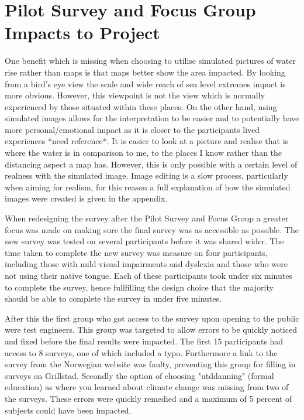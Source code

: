 \section{Pilot Survey and Focus Group Impacts to Project}
One benefit which is missing when choosing to utilise simulated pictures of water rise rather than maps is that maps better show the area impacted. By looking from a bird’s eye view the scale and wide reach of sea level extremes impact is more obvious. However, this viewpoint is not the view which is normally experienced by those situated within these places. On the other hand, using simulated images allows for the interpretation to be easier and to potentially have more personal/emotional impact as it is closer to the participants lived experiences *need reference*. It is easier to look at a picture and realise that is where the water is in comparison to me, to the places I know rather than the distancing aspect a map has. However, this is only possible with a certain level of realness with the simulated image. Image editing is a slow process, particularly when aiming for realism, for this reason a full explanation of how the simulated images were created is given  in the appendix. 

When redesigning the survey after the Pilot Survey and Focus Group a greater focus was made on making sure the final survey was as accessible as possible. The new survey was tested on several participants before it was shared wider. The time taken to complete the new survey was measure on four participants, including those with mild visual impairments and dyslexia and those who were not using their native tongue. Each of these participants took under six minutes to complete the survey, hence fullfilling the design choice that the majority should be able to complete the survey in under five minutes. 

After this the first group who got access to the survey upon opening to the public were test engineers. This group was targeted to allow errors to be quickly noticed and fixed before the final results were impacted. The first 15 participants had access to 8 surveys, one of which included a typo. Furthermore a link to the survey from the Norwegian website was faulty, preventing this group for filling in surveys on Grillstad. Secondly the option of choosing "utddanning" (formal education) as where you learned about climate change was missing from two of the surveys. These errors were quickly remedied and a maximum of 5 percent of subjects could have been impacted. 

